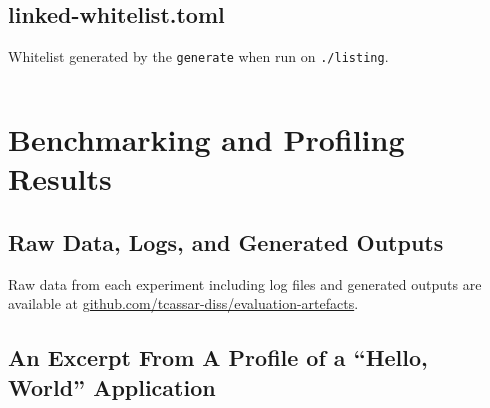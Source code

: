 
\subsection{linked-whitelist.toml}
\begin{listing}[H]
    \caption{Whitelist generated by the \af \texttt{generate} when run on
    \texttt{./listing}.}
    \label{lst:whitelist-toml} %
    \inputminted[fontsize=\small, frame=single, linenos]{toml}{./listings/linkage/linked-whitelist.toml}
\end{listing}

\clearpage

\section{Benchmarking and Profiling Results}

\subsection{Raw Data, Logs, and Generated Outputs}\label{apx:eval-artefacts}
Raw data from each experiment including log files and generated outputs are
available at
\href{https://github.com/tcassar-diss/evaluation-artefacts}{github.com/tcassar-diss/evaluation-artefacts}.

\subsection{An Excerpt From A Profile of a ``Hello, World'' Application}

